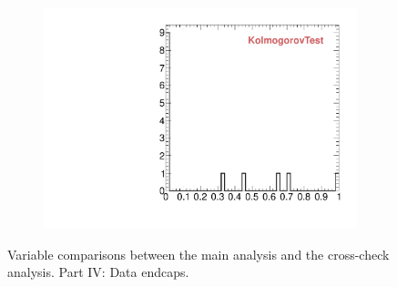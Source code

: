 \begin{figure}
\begin{subfigure}[b]{0.2\textwidth}
                \includegraphics[width=\textwidth]{Figures/VariablesComparison/Data_endcaps_figs/KS}
                \label{fig:Data_endcaps_KS}
        \end{subfigure}
        \caption{Variable comparisons between the main analysis and the cross-check analysis. Part IV: Data endcaps.}
        \label{fig:Data_endcaps_figs}
\end{figure}


